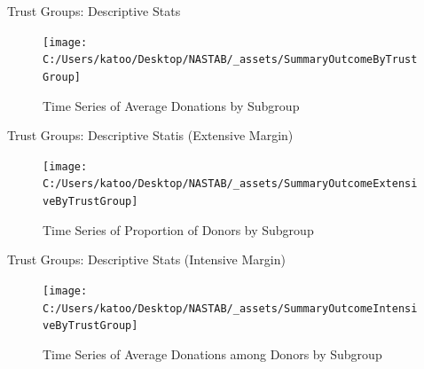 \documentclass[
  ignorenonframetext,
]{beamer}
\begin{document}
\begin{frame}{Trust Groups: Descriptive Stats}
\protect\hypertarget{trust-groups-descriptive-stats}{}
\begin{figure}
\texttt{[image: C:/Users/katoo/Desktop/NASTAB/\_assets/SummaryOutcomeByTrustGroup]} \caption{Time Series of Average Donations by Subgroup}\label{fig:unnamed-chunk-7}
\end{figure}
\end{frame}

\begin{frame}{Trust Groups: Descriptive Statis (Extensive Margin)}
\protect\hypertarget{trust-groups-descriptive-statis-extensive-margin}{}
\begin{figure}
\texttt{[image: C:/Users/katoo/Desktop/NASTAB/\_assets/SummaryOutcomeExtensiveByTrustGroup]} \caption{Time Series of Proportion of Donors by Subgroup}\label{fig:unnamed-chunk-8}
\end{figure}
\end{frame}

\begin{frame}{Trust Groups: Descriptive Stats (Intensive Margin)}
\protect\hypertarget{trust-groups-descriptive-stats-intensive-margin}{}
\begin{figure}
\texttt{[image: C:/Users/katoo/Desktop/NASTAB/\_assets/SummaryOutcomeIntensiveByTrustGroup]} \caption{Time Series of Average Donations among Donors by Subgroup}\label{fig:unnamed-chunk-9}
\end{figure}
\end{frame}
\end{document}

